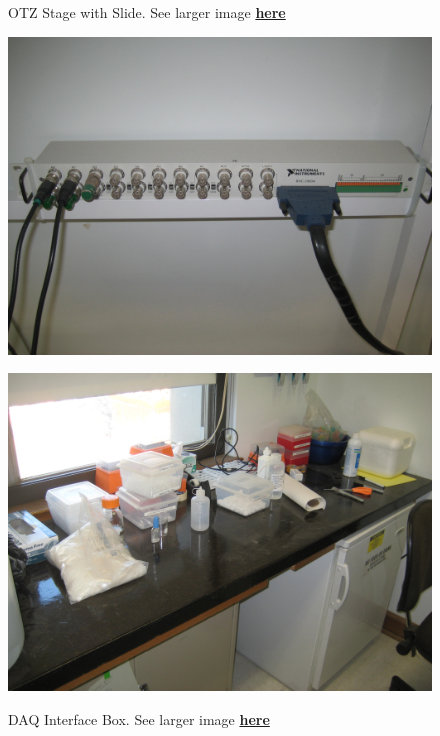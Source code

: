 \documentclass{../lab}
\begin{document}
\begin{figure}[H]
\begin{minipage}{0.32\textwidth}
    \caption{OTZ Stage with Slide. See larger image \href{http://experimentationlab.berkeley.edu/sites/default/files/images/OTZ_3551_Crop.jpg}{\textbf{here}}}
\end{minipage}
\begin{minipage}{0.32\textwidth}
    \href{http://experimentationlab.berkeley.edu/sites/default/files/images/OTZ_DAQ_Interface_3554.jpg}{\includegraphics[width=\linewidth,keepaspectratio]{images/OTZ_DAQ_Interface_3554.jpg}}
    \caption{DAQ Interface Box. See larger image \href{http://experimentationlab.berkeley.edu/sites/default/files/images/OTZ_DAQ_Interface_3554.jpg}{\textbf{here}}}
\end{minipage}
\begin{minipage}{0.32\textwidth}
    \href{http://experimentationlab.berkeley.edu/sites/default/files/images/OTZ_Table_3555.jpg}{\includegraphics[width=\linewidth,keepaspectratio]{images/OTZ_Table_3555.jpg}}

\end{minipage}
\end{figure}
\end{document}

